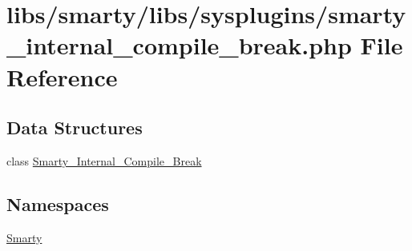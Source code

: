 \hypertarget{smarty__internal__compile__break_8php}{}\section{libs/smarty/libs/sysplugins/smarty\+\_\+internal\+\_\+compile\+\_\+break.php File Reference}
\label{smarty__internal__compile__break_8php}
\subsection*{Data Structures}
\begin{DoxyCompactItemize}
\item 
class \hyperlink{class_smarty___internal___compile___break}{Smarty\+\_\+\+Internal\+\_\+\+Compile\+\_\+\+Break}
\end{DoxyCompactItemize}
\subsection*{Namespaces}
\begin{DoxyCompactItemize}
\item 
 \hyperlink{namespace_smarty}{Smarty}
\end{DoxyCompactItemize}
